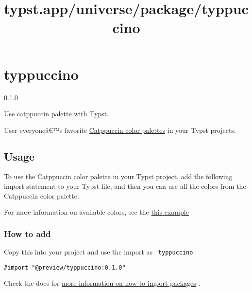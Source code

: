 \title{typst.app/universe/package/typpuccino}

\label{banner}
\section{typpuccino}\label{typpuccino}

{ 0.1.0 }

Use catppuccin palette with Typst.

\label{readme}
User everyoneâ€™s favorite
\href{https://github.com/catppuccin/catppuccin}{Catppuccin color
palettes} in your Typst projects.

\subsection{Usage}\label{usage}

To use the Catppuccin color palette in your Typst project, add the
following import statement to your Typst file, and then you can use all
the colors from the Catppuccin color palette.

\begin{Shaded}
\begin{Highlighting}[]

\end{Highlighting}
\end{Shaded}

For more information on available colors, see the
\href{https://github.com/typst/packages/raw/main/packages/preview/typpuccino/0.1.0/example.pdf}{this
example} .

\subsubsection{How to add}\label{how-to-add}

Copy this into your project and use the import as
\texttt{\ typpuccino\ }

\begin{verbatim}
#import "@preview/typpuccino:0.1.0"
\end{verbatim}



Check the docs for
\href{https://typst.app/docs/reference/scripting/\#packages}{more
information on how to import packages} .

